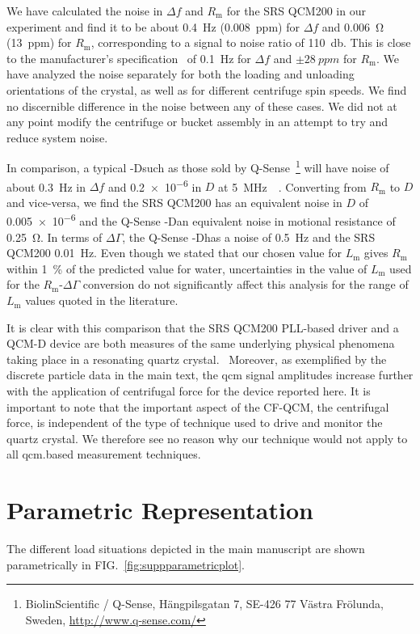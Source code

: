 \documentclass[floatfix,superscriptaddress,a4paper,notitlepage]{revtex4-1}
\newcommand{\Figure}[1]{FIG.~\ref{#1}}
\newcommand{\df}{\Delta\!f}
\newcommand{\dg}{\Delta\Gamma}
\newcommand{\Rm}{R_\mathrm{m}}
\newcommand{\Lm}{L_\mathrm{m}}
\begin{document}
We have calculated the noise in $\df$ and $\Rm$ for the SRS QCM200 in our
experiment and find it to be about \SI{0.4}{\hertz} (\SI{0.008}{ppm}) for
$\df$ and \SI{0.006}{\ohm} (\SI{13}{ppm}) for $\Rm$, corresponding to a
signal to noise ratio of \SI{110}{\decibel}.  This is close to the
manufacturer's specification~\cite{srsqcm200manual} of \SI{0.1}{\hertz} for
$\df$ and $\pm\SI{28}{ppm}$ for $\Rm$.  We have analyzed the noise
separately for both the loading and unloading orientations of the crystal,
as well as for different centrifuge spin speeds.  We find no discernible
difference in the noise between any of these cases.  We did not at any
point modify the centrifuge or bucket assembly in an attempt to try and
reduce system noise.

In comparison, a typical \QCM-Dsuch as those sold by
Q-Sense~\footnote{BiolinScientific / Q-Sense, Hängpilsgatan 7, SE-426 77
  Västra Frölunda, Sweden,  \url{http://www.q-sense.com/}} will have noise of
about \SI{0.3}{\hertz} in $\df$ and \num{0.2e-6} in $D$ at
\SI{5}{\mega\hertz}~\cite{su2005comparison}~\cite{peh2007understanding}.
Converting from $\Rm$ to $D$ and vice-versa, we find the SRS QCM200 has an
equivalent noise in $D$ of \num{0.005e-6} and the Q-Sense \QCM-Dan
equivalent noise in motional resistance of \SI{0.25}{\ohm}.  In terms of
$\dg$, the Q-Sense \QCM-Dhas a noise of \SI{0.5}{\hertz} and the SRS QCM200
\SI{0.01}{\hertz}.  Even though we stated that our chosen value for $\Lm$
gives $\Rm$ within \SI{1}{\percent} of the predicted value for water,
uncertainties in the value of $\Lm$ used for the $\Rm$-$\dg$ conversion do
not significantly affect this analysis for the range of $\Lm$ values quoted
in the literature.

It is clear with this comparison that the SRS QCM200 PLL-based driver and a
QCM-D device are both measures of the same underlying physical phenomena
taking place in a resonating quartz crystal.~\cite{geelhood2002transient}
Moreover, as exemplified by the discrete particle data in the main text,
the \gls{qcm} signal amplitudes increase further with the application of
centrifugal force for the device reported here.  It is important to note
that the important aspect of the CF-QCM, the centrifugal force, is
independent of the type of technique used to drive and monitor the quartz
crystal.  We therefore see no reason why our technique would not apply to
all \gls{qcm}.based measurement techniques.

\section{Parametric Representation}
The different load situations depicted in the main manuscript are shown
parametrically in \Figure{fig:suppparametricplot}.
\end{document}
